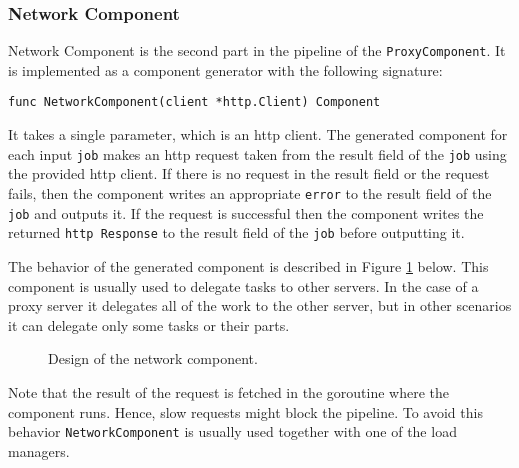 \subsubsection{Network Component}
Network Component is the second part in the pipeline of the 
\texttt{ProxyComponent}. It is implemented as a component generator 
with the following signature:
\begin{lstlisting}
func NetworkComponent(client *http.Client) Component
\end{lstlisting}
It takes a single parameter, which is an http client.
The generated component for each input \texttt{job} makes an http request 
taken from the result field of the \texttt{job} using the 
provided http client.
If there is no request in the result field or the request fails, then
the component writes an appropriate \texttt{error} to the result field of the
\texttt{job} and outputs it. If the request is successful then 
the component writes the returned \texttt{http Response} to the 
result field of the \texttt{job} before outputting it.

The behavior of the generated component is described in 
Figure \ref{fig:networkComp} below. This component is usually used
to delegate tasks to other servers. In the case of a proxy server
it delegates all of the work to the other server, but in other scenarios
it can delegate only some tasks or their parts.
\begin{figure}[h]
\centering
{}
\caption[scale=1.0]{Design of the network component.}
\label{fig:networkComp}
\end{figure}

Note that the result of the request is fetched in the goroutine where the
component runs. Hence, slow requests might block the pipeline. To avoid
this behavior \texttt{NetworkComponent} is usually used together with one
of the load managers. 

